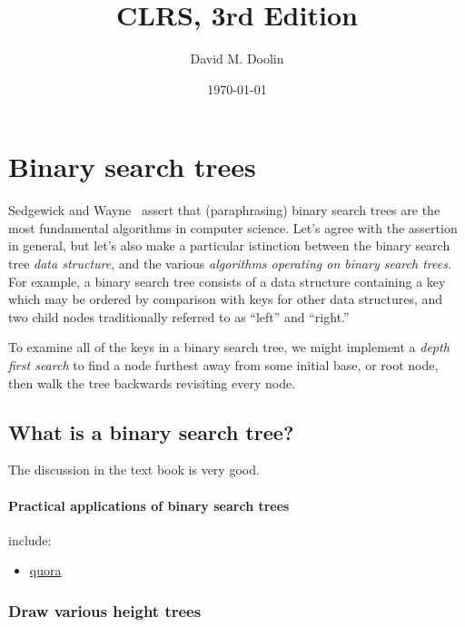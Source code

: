 \documentclass{article}
\title{CLRS, 3rd Edition}
\date{\today}
\author{David M. Doolin}
\begin{document}
\maketitle


\tableofcontents

\setcounter{section}{11}
\section{Binary search trees}

Sedgewick and Wayne~\cite{sedgewick:r2011} assert that (paraphrasing)
binary search trees are the most fundamental algorithms
in computer science. Let's agree with the assertion in
general, but let's also make a particular istinction between the
binary search tree \emph{data structure}, and the various
\emph{algorithms operating on binary search trees}. For example,
a binary search tree consists of a data structure containing a key
which may be ordered by comparison with keys for other data structures,
and two child nodes traditionally referred to as ``left'' and ``right.''

To examine all of the keys in a binary search tree, we might
implement a \emph{depth first search} to find a node furthest
away from some initial base, or root node, then walk the tree
backwards revisiting every node.



\subsection{What is a binary search tree?}

The discussion in the text book is very good.

\paragraph{Practical applications of binary search trees} include:

\begin{itemize}
  \item \href{https://www.quora.com/What-are-some-practical-applications-of-binary-trees/answer/Az-Na?__nsrc__=4&__snid3__=1020331524}{quora}
\end{itemize}

\subsubsection{Draw various height trees}
\end{document}
